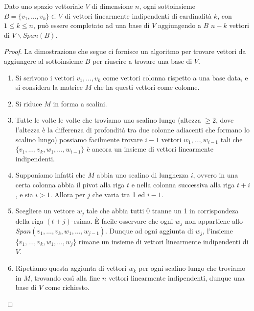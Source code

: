 \begin{theorem}[Completamento]
	Dato uno spazio vettoriale $V$ di dimensione $n$, ogni
	sottoinsieme $B = \{v_1, \dots, v_k\} \subset V$ di vettori
	linearmente indipendenti di cardinalità $k$, con
	$1 \leq k \leq n$, può essere completato ad una base di $V$
	aggiungendo a $B$ $n - k$ vettori di $V \backslash Span(B)$.
	\begin{proof}
		La dimostrazione che segue ci fornisce un algoritmo per trovare
		vettori da aggiungere al sottoinsieme $B$ per riuscire a trovare
		una base di $V$.
		\begin{enumerate}
			\item Si scrivono i vettori $v_1, \dots, v_k$ come
			      vettori colonna rispetto a una base data, e si considera
			      la matrice $M$ che ha questi vettori come colonne.
			\item Si riduce $M$ in forma a scalini.
			\item Tutte le volte le volte che troviamo uno scalino lungo
			      (altezza $\geq 2$, dove l'altezza è la differenza di profondità
			      tra due colonne adiacenti che formano lo scalino lungo) possiamo
			      facilmente trovare $i - 1$ vettori $w_1, \dots, w_{i - 1}$ tali che
			      $\{v_1, \dots, v_k, w_1, \dots, w_{i - 1}\}$ è ancora un
			      insieme di vettori linearmente indipendenti.
			\item Supponiamo infatti che $M$ abbia uno scalino di lunghezza $i$,
			      ovvero in una certa colonna abbia il pivot alla riga $t$ e nella
			      colonna successiva alla riga $t+i$, e sia $i > 1$. Allora
			      per $j$ che varia tra 1 ed $i - 1$.
			\item Scegliere un vettore $w_j$ tale che abbia tutti
			      0 tranne un 1 in corrispondeza della riga $(t + j)$-esima.
			      È facile osservare che ogni $w_j$ non appartiene
			      allo $Span(v_1, \dots, v_k, w_1, \dots, w_{j-1})$. Dunque ad
			      ogni aggiunta di $w_j$, l'insieme
			      $\{v_1, \dots, v_k, w_1, \dots, w_j\}$ rimane un insieme di
			      vettori linearmente indipendenti di $V$.
			\item Ripetiamo questa aggiunta di vettori $w_k$ per ogni scalino
			      lungo che troviamo in $M$, trovando così alla fine $n$ vettori
			      linearmente indipendenti, dunque una base di $V$ come richiesto.
		\end{enumerate}
	\end{proof}
\end{theorem}

